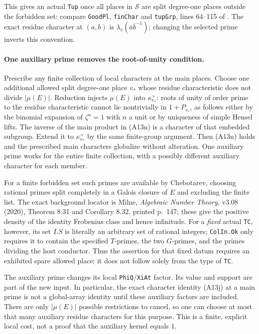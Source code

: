 \documentclass[11pt]{article}
\theoremstyle{definition}\newtheorem{definition}[theorem]{Definition}\newtheorem{remark}[theorem]{Remark}
\begin{document}
This gives an actual \texttt{Tup} once all places in
$\mathcal S$ are split degree-one places outside the
forbidden set: compare \texttt{GoodPl}, \texttt{finChar}
and \texttt{tupGrp}, lines 64--115 of
.
The exact residue character at $(a,b)$ is
$\lambda_v(\bar a\bar b^{-1})$; changing the selected
prime inverts this convention.

\paragraph{One auxiliary prime removes the root-of-unity condition.}
Prescribe any finite collection of local characters at the
main places.  Choose one additional allowed split degree-one
place $v_*$ whose residue characteristic does not divide
$|\mu(E)|$.  Reduction injects $\mu(E)$ into
$\kappa_{v_*}^\times$: roots of unity of order prime to
the residue characteristic cannot lie nontrivially in
$1+P_{v_*}$, as follows either by the binomial expansion
of $\zeta^n=1$ with $n$ a unit or by uniqueness of simple
Hensel lifts.  The inverse of the main product in (A13n)
is a character of that embedded subgroup.  Extend it to
$\kappa_{v_*}^\times$ by the same finite-group argument.
Then (A13n) holds and the prescribed main characters
globalize without alteration.  One auxiliary prime works
for the entire finite collection, with a possibly different
auxiliary character for each member.

For a finite forbidden set such primes are available by
Chebotarev, choosing rational primes split completely in
a Galois closure of $E$ and excluding the finite list.
The exact background locator is Milne, \emph{Algebraic Number
Theory}, v3.08 (2020), Theorem 8.31 and Corollary 8.32,
printed p.~147; these give the positive density of the
identity Frobenius class and hence infinitude.
For a \emph{fixed} actual \texttt{TC}, however, its set
$I.S$ is literally an arbitrary set of rational integers;
\texttt{ColIn.Ok} only requires it to contain the specified
$T$-primes, the two $G$-primes, and the primes dividing
the host conductor.  Thus the assertion for that fixed
datum requires an exhibited spare allowed place; it does
not follow solely from the type of \texttt{TC}.

The auxiliary prime changes its local \texttt{PhiQ}/\texttt{XiAt}
factor.  Its value and support are part of the new input.
In particular, the exact character identity (A13j)
at a main prime is not a global-array identity until
these auxiliary factors are included.  There are only
$|\mu(E)|$ possible restrictions to cancel, so one can
choose at most that many auxiliary residue characters
for this purpose.  This is a finite, explicit local cost,
not a proof that the auxiliary kernel equals $1$.
\end{document}
